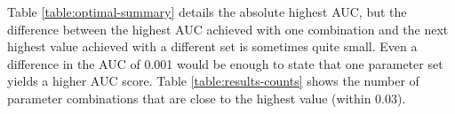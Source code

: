 \documentclass[letterpaper, notitlepage]{report}
\begin{document}
{

}




%





Table \ref{table:optimal-summary} details the absolute highest \gls{AUC}, but the difference between the highest AUC achieved with one combination and the next highest value achieved with a different set is sometimes quite small. Even a difference in the AUC of 0.001 would be enough to state that one parameter set yields a higher AUC score. Table \ref{table:results-counts} shows the number of parameter combinations that are close to the highest value (within 0.03). 

%
%

\end{document}
